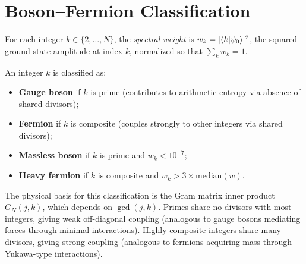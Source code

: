 \documentclass[11pt,a4paper]{article}
\begin{document}
\section{Boson--Fermion Classification}
\label{sec:classification}

\begin{definition}
For each integer $k \in \{2, \ldots, N\}$, the \emph{spectral weight}
is $w_k = |\langle k | \psi_0 \rangle|^2$, the squared ground-state amplitude
at index $k$, normalized so that $\sum_k w_k = 1$.
\end{definition}

\begin{definition}
An integer $k$ is classified as:
\begin{itemize}
  \item \textbf{Gauge boson} if $k$ is prime (contributes to arithmetic
    entropy via absence of shared divisors);
  \item \textbf{Fermion} if $k$ is composite (couples strongly to other
    integers via shared divisors);
  \item \textbf{Massless boson} if $k$ is prime and $w_k < 10^{-7}$;
  \item \textbf{Heavy fermion} if $k$ is composite and $w_k > 3 \times
    \text{median}(w)$.
\end{itemize}
\end{definition}

The physical basis for this classification is the Gram matrix inner
product $G_N(j,k)$, which depends on $\gcd(j,k)$. Primes share no
divisors with most integers, giving weak off-diagonal coupling
(analogous to gauge bosons mediating forces through minimal
interactions). Highly composite integers share many divisors, giving
strong coupling (analogous to fermions acquiring mass through
Yukawa-type interactions).
\end{document}
